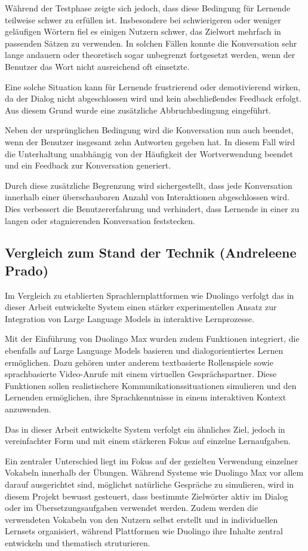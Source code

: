 Während der Testphase zeigte sich jedoch, dass diese Bedingung für Lernende teilweise schwer zu erfüllen ist. 
Insbesondere bei schwierigeren oder weniger geläufigen Wörtern fiel es einigen Nutzern schwer, das Zielwort mehrfach in passenden Sätzen zu verwenden. 
In solchen Fällen konnte die Konversation sehr lange andauern oder theoretisch sogar unbegrenzt fortgesetzt werden, wenn der Benutzer das Wort nicht ausreichend oft einsetzte.

Eine solche Situation kann für Lernende frustrierend oder demotivierend wirken, da der Dialog nicht abgeschlossen wird und kein abschließendes Feedback erfolgt. 
Aus diesem Grund wurde eine zusätzliche Abbruchbedingung eingeführt.

Neben der ursprünglichen Bedingung wird die Konversation nun auch beendet, wenn der Benutzer insgesamt zehn Antworten gegeben hat. 
In diesem Fall wird die Unterhaltung unabhängig von der Häufigkeit der Wortverwendung beendet und ein Feedback zur Konversation generiert.

Durch diese zusätzliche Begrenzung wird sichergestellt, dass jede Konversation innerhalb einer überschaubaren Anzahl von Interaktionen abgeschlossen wird. 
Dies verbessert die Benutzererfahrung und verhindert, dass Lernende in einer zu langen oder stagnierenden Konversation feststecken.

\subsection{Vergleich zum Stand der Technik (Andreleene Prado)}
Im Vergleich zu etablierten Sprachlernplattformen wie Duolingo verfolgt das in dieser Arbeit entwickelte System einen stärker experimentellen Ansatz zur Integration von Large Language Models in interaktive Lernprozesse. 

Mit der Einführung von Duolingo Max wurden zudem Funktionen integriert, die ebenfalls auf Large Language Models basieren und dialogorientiertes Lernen ermöglichen. 
Dazu gehören unter anderem textbasierte Rollenspiele sowie sprachbasierte Video-Anrufe mit einem virtuellen Gesprächspartner. 
Diese Funktionen sollen realistischere Kommunikationssituationen simulieren und den Lernenden ermöglichen, ihre Sprachkenntnisse in einem interaktiven Kontext anzuwenden.

Das in dieser Arbeit entwickelte System verfolgt ein ähnliches Ziel, jedoch in vereinfachter Form und mit einem stärkeren Fokus auf einzelne Lernaufgaben. 

Ein zentraler Unterschied liegt im Fokus auf der gezielten Verwendung einzelner Vokabeln innerhalb der Übungen.
Während Systeme wie Duolingo Max vor allem darauf ausgerichtet sind, möglichst natürliche Gespräche zu simulieren, wird in diesem Projekt bewusst gesteuert, dass bestimmte Zielwörter aktiv im Dialog oder im Übersetzungsaufgaben verwendet werden. 
Zudem werden die verwendeten Vokabeln von den Nutzern selbst erstellt und in individuellen Lernsets organisiert, während Plattformen wie Duolingo ihre Inhalte zentral entwickeln und thematisch struturieren.

